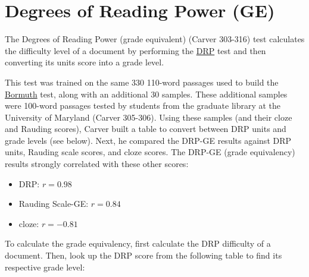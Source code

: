 \documentclass[
]{book}
\providecommand{\tightlist}{%
  \setlength{\itemsep}{0pt}\setlength{\parskip}{0pt}}
\theoremstyle{definition}
\theoremstyle{definition}
\theoremstyle{definition}
\theoremstyle{definition}
\theoremstyle{remark}
\begin{document}

\newpage

\hypertarget{degrees-of-reading-power-grade-equivalent}{%
\section{\texorpdfstring{Degrees of Reading Power (GE)}{Degrees of Reading Power (GE)}}\label{degrees-of-reading-power-grade-equivalent}}

The Degrees of Reading Power (grade equivalent) (Carver 303-316) test calculates the difficulty level of a document by performing the \protect\hyperlink{degrees-of-reading-power}{DRP} test and then converting its units score into a grade level.

This test was trained on the same 330 110-word passages used to build the \protect\hyperlink{bormuth-cloze-mean-machine-passage}{Bormuth} test, along with an additional 30 samples. These additional samples were 100-word passages tested by students from the graduate library at the University of Maryland (Carver 305-306). Using these samples (and their cloze and Rauding scores), Carver built a table to convert between DRP units and grade levels (see below). Next, he compared the DRP-GE results against DRP units, Rauding scale scores, and cloze scores. The DRP-GE (grade equivalency) results strongly correlated with these other scores:

\begin{itemize}
\tightlist
\item
  DRP: \(r = 0.98\)
\item
  Rauding Scale-GE: \(r = 0.84\)
\item
  cloze: \(r = -0.81\)
\end{itemize}

To calculate the grade equivalency, first calculate the DRP difficulty of a document. Then, look up the DRP score from the following table to find its respective grade level:
\end{document}
